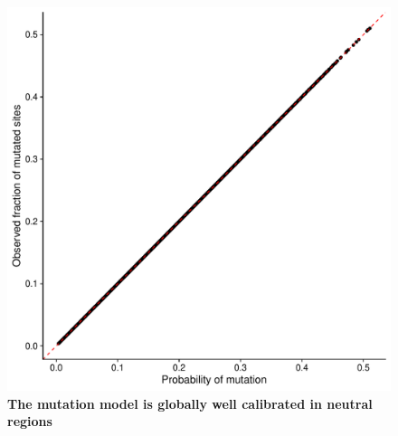 \documentclass[times, twoside, watermark]{zHenriquesLab-StyleBioRxiv}
\begin{document}
\begin{figure}
    \centering
    \includegraphics[width = 0.5\linewidth]{supplemental_figures/mutation_model_calibration.pdf}
    \caption{\textbf{The mutation model is globally well calibrated in neutral regions}}
    \label{Sfig:mutation_model_calibration}
\end{figure}
\end{document}
